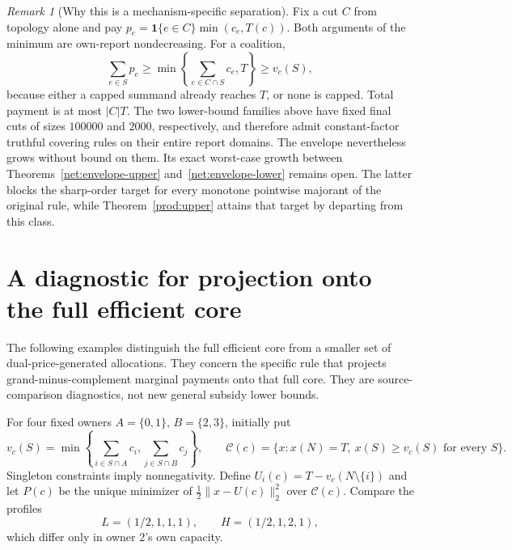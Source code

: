 \documentclass[11pt]{article}
\theoremstyle{definition}\newtheorem{definition}[theorem]{Definition}
\theoremstyle{remark}\newtheorem{remark}[theorem]{Remark}
\newcommand{\ind}{\mathbf 1}
\begin{document}
\begin{remark}[Why this is a mechanism-specific separation]
\label{net:fixed-cut}
Fix a cut $C$ from topology alone and pay
$p_e=\ind\{e\in C\}\min(c_e,T(c))$.
Both arguments of the minimum are own-report nondecreasing.  For a coalition,
\[
 \sum_{e\in S}p_e\ge
 \min\left\{\sum_{e\in C\cap S}c_e,T\right\}\ge v_c(S),
\]
because either a capped summand already reaches $T$, or none is capped.
Total payment is at most $|C|T$.  The two lower-bound families above have
fixed final cuts of sizes $100000$ and $2000$, respectively, and therefore
admit constant-factor truthful covering rules on their entire report domains.
The envelope nevertheless grows without bound on them.  Its exact worst-case
growth between Theorems~\ref{net:envelope-upper} and~\ref{net:envelope-lower}
remains open.  The latter blocks the sharp-order target for every monotone
pointwise majorant of the original rule, while Theorem~\ref{prod:upper}
attains that target by departing from this class.
\end{remark}

\section{A diagnostic for projection onto the full efficient core}
\label{net:projection}
The following examples distinguish the full efficient core from a smaller
set of dual-price-generated allocations.  They concern the specific rule
that projects grand-minus-complement marginal payments onto that full core.
They are source-comparison diagnostics, not new general subsidy lower bounds.

For four fixed owners $A=\{0,1\}$, $B=\{2,3\}$, initially put
\[
 v_c(S)=\min\left\{\sum_{i\in S\cap A}c_i,
                         \sum_{j\in S\cap B}c_j\right\},\qquad
 \mathcal C(c)=\{x:x(N)=T,\ x(S)\ge v_c(S)\text{ for every }S\}.
\]
Singleton constraints imply nonnegativity.  Define
$U_i(c)=T-v_c(N\setminus\{i\})$ and let $P(c)$ be the unique minimizer
of $\frac12\|x-U(c)\|_2^2$ over $\mathcal C(c)$.
Compare the profiles
\[
 L=(1/2,1,1,1),\qquad H=(1/2,1,2,1),
\]
which differ only in owner 2's own capacity.
\end{document}
